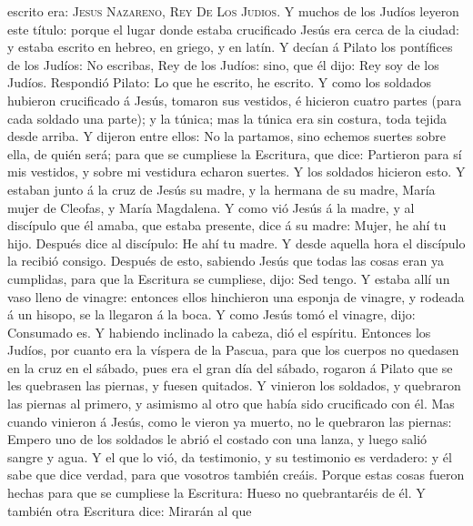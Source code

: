 escrito era: \textsc{Jesus} \textsc{Nazareno}, \textsc{Rey} \textsc{De}
\textsc{Los} \textsc{Judios}.  Y muchos de los Judíos
leyeron este título: porque el lugar donde estaba crucificado Jesús era
cerca de la ciudad: y estaba escrito en hebreo, en griego, y en latín.
 Y decían á Pilato los pontífices de los Judíos: No
escribas, Rey de los Judíos: sino, que él dijo: Rey soy de los Judíos.
 Respondió Pilato: Lo que he escrito, he escrito.
 Y como los soldados hubieron crucificado á Jesús,
tomaron sus vestidos, é hicieron cuatro partes (para cada soldado una
parte); y la túnica; mas la túnica era sin costura, toda tejida desde
arriba.  Y dijeron entre ellos: No la partamos, sino
echemos suertes sobre ella, de quién será; para que se cumpliese la
Escritura, que dice: Partieron para sí mis vestidos, y sobre mi
vestidura echaron suertes. Y los soldados hicieron esto. 
Y estaban junto á la cruz de Jesús su madre, y la hermana de su madre,
María mujer de Cleofas, y María Magdalena.  Y como vió
Jesús á la madre, y al discípulo que él amaba, que estaba presente, dice
á su madre: Mujer, he ahí tu hijo.  Después dice al
discípulo: He ahí tu madre. Y desde aquella hora el discípulo la recibió
consigo.  Después de esto, sabiendo Jesús que todas las
cosas eran ya cumplidas, para que la Escritura se cumpliese, dijo: Sed
tengo.  Y estaba allí un vaso lleno de vinagre: entonces
ellos hinchieron una esponja de vinagre, y rodeada á un hisopo, se la
llegaron á la boca.  Y como Jesús tomó el vinagre, dijo:
Consumado es. Y habiendo inclinado la cabeza, dió el espíritu.
 Entonces los Judíos, por cuanto era la víspera de la
Pascua, para que los cuerpos no quedasen en la cruz en el sábado, pues
era el gran día del sábado, rogaron á Pilato que se les quebrasen las
piernas, y fuesen quitados.  Y vinieron los soldados, y
quebraron las piernas al primero, y asimismo al otro que había sido
crucificado con él.  Mas cuando vinieron á Jesús, como le
vieron ya muerto, no le quebraron las piernas:  Empero
uno de los soldados le abrió el costado con una lanza, y luego salió
sangre y agua.  Y el que lo vió, da testimonio, y su
testimonio es verdadero: y él sabe que dice verdad, para que vosotros
también creáis.  Porque estas cosas fueron hechas para
que se cumpliese la Escritura: Hueso no quebrantaréis de él.
 Y también otra Escritura dice: Mirarán al que
